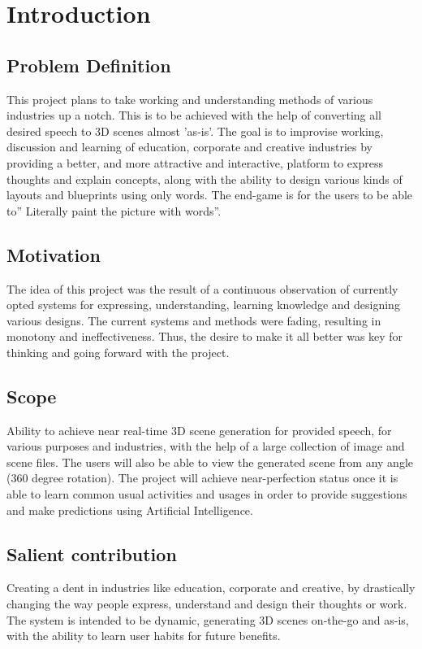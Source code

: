 \centre \chapter{Introduction}
\section{Problem Definition}
\par This project plans to take working and understanding methods of various industries up a notch. This is to be achieved with the help of converting all desired speech to 3D scenes almost ’as-is’. The goal is to improvise working, discussion and learning of education, corporate and creative industries by providing a better, and more attractive and interactive, platform to express thoughts and explain concepts, along with the ability to design various kinds of layouts and blueprints using only words. The end-game is for the users to be able to” Literally paint the picture with words”.
\section{Motivation}
The idea of this project was the result of a continuous observation of currently opted systems for expressing, understanding, learning knowledge and designing various designs. The current systems and methods were fading, resulting in monotony and ineffectiveness. Thus, the desire to make it all better was key for thinking and going forward with the project.
\section{Scope}
Ability to achieve near real-time 3D scene generation for provided speech, for various purposes and industries, with the help of a large collection of image and scene files. The users will also be able to view the generated scene from any angle (360 degree rotation). The project will achieve near-perfection status once it is able to learn common usual activities and usages in order to provide suggestions and make predictions using Artificial Intelligence.
\section{Salient contribution}
Creating a dent in industries like education, corporate and creative, by drastically changing the way people express, understand and design their thoughts or work. The system is intended to be dynamic, generating 3D scenes on-the-go and as-is, with the ability to learn user habits for future benefits.
